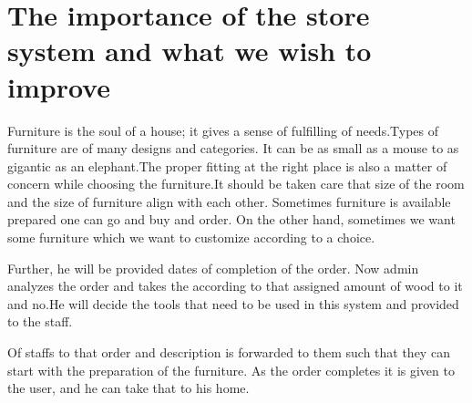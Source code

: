 \vspace{2cm}
\section{The importance of the store system and what we wish to improve}
\hspace{0.7cm} Furniture is the soul of a house; it gives a sense of fulfilling of needs.Types of furniture are of many designs and categories. It can be as small as a mouse to as gigantic as an elephant.The proper fitting at the right place is also a matter of concern while choosing the furniture.It should be taken care that size of the room and the size of furniture align with each other. Sometimes furniture is available prepared one can go and buy and order. On the other hand, sometimes we want some furniture which we want to customize according to a choice. 

\hspace{0.7cm} Further, he will be provided dates of completion of the order. Now admin analyzes the order and takes the according to that assigned amount of wood to it and no.He will decide the tools that need to be used in this system and provided to the staff.

\hspace{0.7cm} Of staffs to that order and description is forwarded to them such that they can start with the preparation of the furniture. As the order completes it is given to the user, and he can take that to his home.
